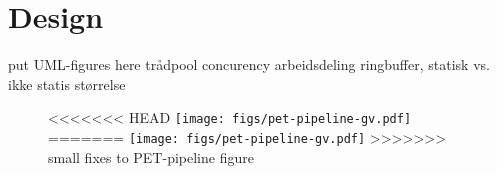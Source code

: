 \section{Design}
put UML-figures here
trådpool
concurency
arbeidsdeling
ringbuffer, statisk vs. ikke statis størrelse

\begin{figure}
<<<<<<< HEAD
    \texttt{[image: figs/pet-pipeline-gv.pdf]}
=======
    \texttt{[image: figs/pet-pipeline-gv.pdf]}
>>>>>>> small fixes to PET-pipeline figure
\end{figure}

